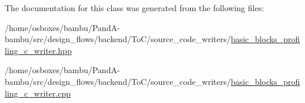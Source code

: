 The documentation for this class was generated from the following files\+:\begin{DoxyCompactItemize}
\item 
/home/osboxes/bambu/\+Pand\+A-\/bambu/src/design\+\_\+flows/backend/\+To\+C/source\+\_\+code\+\_\+writers/\hyperlink{basic__blocks__profiling__c__writer_8hpp}{basic\+\_\+blocks\+\_\+profiling\+\_\+c\+\_\+writer.\+hpp}\item 
/home/osboxes/bambu/\+Pand\+A-\/bambu/src/design\+\_\+flows/backend/\+To\+C/source\+\_\+code\+\_\+writers/\hyperlink{basic__blocks__profiling__c__writer_8cpp}{basic\+\_\+blocks\+\_\+profiling\+\_\+c\+\_\+writer.\+cpp}\end{DoxyCompactItemize}
